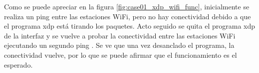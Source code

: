 Como se puede apreciar en la figura \ref{fig:case01_xdp_wifi_func}, inicialmente se realiza un ping \hspace{1mm} entre las estaciones WiFi, pero no hay conectividad debido a que el programa \gls{xdp} está tirando los paquetes. Acto seguido se quita el programa \gls{xdp} de la interfaz y se vuelve a probar la conectividad entre las estaciones WiFi ejecutando un segundo ping \hspace{1mm}. Se ve que una vez desanclado el programa, la conectividad vuelve, por lo que se puede afirmar que el funcionamiento es el esperado.  